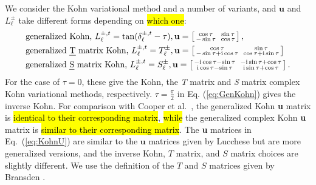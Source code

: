 \documentclass[preprint,showpacs,showkeys,preprintnumbers,amsmath,amssymb,longbibliography,pra,aps]{revtex4-1}
\newcommand{\ii}{{\rm{i}}}
\newcommand{\todoi}{\todo[inline]}
\begin{document}
We consider the Kohn variational method and a number of variants,
and $\textbf{u}$ and $L^{\pm}_\ell$ take
different forms depending on \hl{which one}:
\begin{subequations}
\label{eq:KohnU}
\begin{align}
&\text{generalized Kohn, } L^{\pm,t}_\ell = \tan(\delta^{\pm,t}_\ell-\tau),
 \textbf{u} = \left[ \begin{smallmatrix}
\cos \tau & \ \sin \tau \\  -\sin \tau & \  \cos \tau
\end{smallmatrix} \right], \label{eq:GenKohn}\\
&\text{generalized \emph{T} matrix Kohn, } L^{\pm,t}_\ell = T_\ell^{\pm},
 \textbf{u} = \left[ \begin{smallmatrix}
\cos\tau & \ \sin\tau \\ -\sin\tau + \ii \cos\tau & \ \cos\tau + \ii \sin\tau
\end{smallmatrix} \right] \label{eq:GenTKohn} \\
&\text{generalized \emph{S} matrix Kohn, } L^{\pm,t}_\ell = S_\ell^{\pm},
 \textbf{u} = \left[ \begin{smallmatrix}
-\ii \cos\tau - \sin\tau & \ -\ii\sin\tau + \cos\tau \\ 
 \ii\cos\tau - \sin\tau & \ \ii\sin\tau + \cos\tau
\end{smallmatrix} \right]. \label{eq:GenSKohn}
\end{align}
\end{subequations}
For the case of $\tau = 0$, these give the Kohn, the \emph{T} matrix and
\emph{S} matrix complex Kohn variational methods, respectively.
$\tau = \frac{\pi}{2}$ in Eq. (\ref{eq:GenKohn})
gives the inverse Kohn. 
For comparison with Cooper et al.\ \cite{Cooper2010}, the generalized
Kohn \textbf{u} matrix is \hl{identical to their corresponding matrix},
\hl{while} the generalized complex Kohn
\textbf{u} matrix is \hl{similar to their corresponding matrix}.
The \textbf{u} matrices in Eq.~(\ref{eq:KohnU}) are similar to the
$\textbf{u}$ matrices given by Lucchese \cite{Lucchese1989} but are more 
generalized versions, and the inverse Kohn, $T$ matrix, and $S$ matrix choices are 
slightly different. We use the definition of the $T$ and $S$ matrices
given by Bransden \cite{Bransden1970}.
\end{document}
